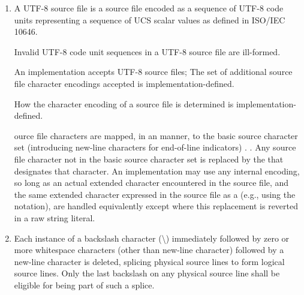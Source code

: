 \documentclass{wg21}
\begin{document}
\begin{enumerate}
    \item

\begin{addedblock}
    A UTF-8 source file is a source file encoded as a sequence of UTF-8 code units representing a sequence of UCS scalar values as defined in ISO/IEC 10646.

    \begin{note}
        Invalid UTF-8 code unit sequences in a UTF-8 source file are ill-formed.
    \end{note}
    An implementation accepts UTF-8 source files; The set of additional source file character encodings accepted is implementation-defined.

    How the character encoding of a source file is determined is implementation-defined.
\end{addedblock}

ource file characters are mapped, in an
 manner,
to the basic source character set (introducing new-line characters for end-of-line
indicators) .
.
Any source file character not in the basic source character set is replaced by the  that
designates that character.
An implementation may use any internal
encoding, so long as an actual extended character encountered in the
source file, and the same extended character expressed in the source
file as a  (e.g., using the  notation), are handled equivalently except where this replacement is reverted in a raw string literal.

\item
{}%
%
Each instance of a backslash character (\textbackslash)
immediately followed by zero or more whitespace characters (other than new-line character) followed by a new-line character is deleted, splicing
physical source lines to form logical source lines. Only the last
backslash on any physical source line shall be eligible for being part
of such a splice.

\end{enumerate}
\end{document}

